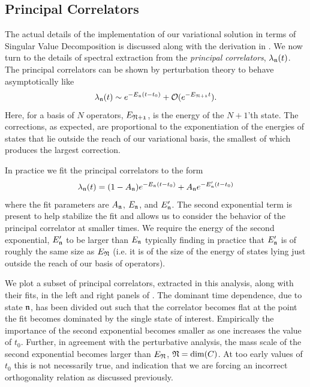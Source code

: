  
 


\subsection{Principal Correlators} \label{sec::Spec:corrConstructPcorr}
The actual details of the implementation of our variational solution in terms of Singular Value Decomposition is discussed along with the derivation in . We now turn to the details of spectral extraction from the \emph{principal correlators}, $\lambda_{\mathfrak{n}}(t)$. The principal correlators can be shown by perturbation theory \cite{Blossier:2009kd} to behave asymptotically like
\begin{equation*}
\lambda_{\mathfrak{n}}(t) \sim e^{-E_\mathfrak{n}(t-t_0)} + \mathcal{O}(e^{-E_{\mathfrak{N+1}}t}).
\end{equation*}
Here, for a basis of $N$ operators, $E_{\mathfrak{N+1}}$, is the energy of the $N+1$'th state.  The corrections, as expected, are proportional to the exponentiation of the energies of states that lie outside the reach of our variational basis, the smallest of which produces the largest correction. 

In practice we fit the principal correlators to the form 
\begin{equation*}
\lambda_{\mathfrak{n}}(t) = (1-A_{\mathfrak{n}})e^{-E_{\mathfrak{n}}(t-t_0)} + A_{\mathfrak{n}}e^{-E'_{\mathfrak{n}}(t-t_0)}
\end{equation*}
where the fit parameters are $A_{\mathfrak{n}}$, $E_{\mathfrak{n}}$, and $E'_{\mathfrak{n}}$. The second exponential term is present to help stabilize the fit and allows us to consider the behavior of the principal correlator at smaller times. We require the energy of the second exponential, $E'_{\mathfrak{n}}$ to be larger than  $E_{\mathfrak{n}}$ typically finding in practice that $E'_{\mathfrak{n}}$ is of roughly the same size as $E_{\mathfrak{N}}$ (i.e. it is of the size of the energy of states lying just outside the reach of our basis of operators). 

We plot a subset of principal correlators, extracted in this analysis, along with their fits, in the left and right panels of  . The dominant time dependence, due to state $\mathfrak{n}$, has been divided out such that the correlator becomes flat at the point the fit becomes dominated by the single state of interest. Empirically the importance of the second exponential becomes smaller as one increases the value of $t_0$. Further, in agreement with the perturbative analysis, the mass scale of the second exponential becomes larger than $E_{\mathfrak{N}}$, $\mathfrak{N} = \mathrm{dim}(C)$. At too early values of $t_0$ this is not necessarily true, and indication that we are forcing an incorrect orthogonality relation as discussed previously. 

